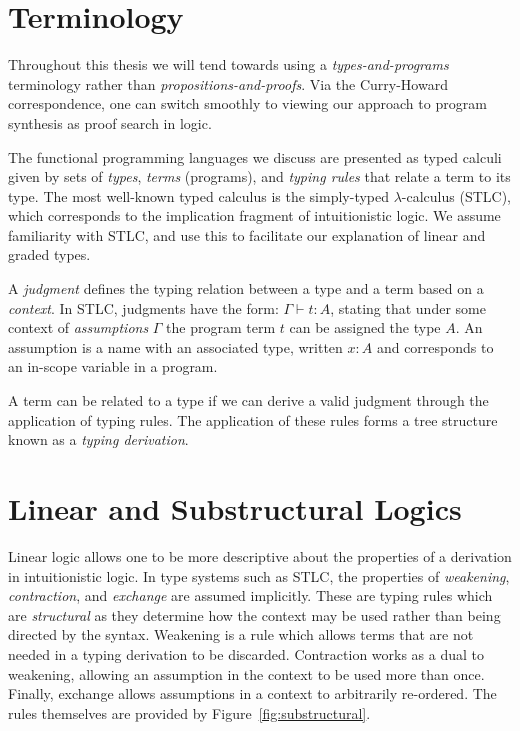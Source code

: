 \section{Terminology}
Throughout this thesis we will tend towards using a \textit{types-and-programs}
terminology rather than \textit{propositions-and-proofs}. Via the Curry-Howard
correspondence, one can switch smoothly to viewing our approach to program
synthesis as proof search in logic.

The functional programming languages we discuss are presented as typed
calculi given by sets of \textit{types}, \textit{terms} (programs), and \textit{typing
 rules} that relate a term to its type. The most well-known typed
calculus is the simply-typed $\lambda$-calculus (STLC), which corresponds to
the implication fragment of intuitionistic logic. We assume familiarity with STLC, and 
use this to facilitate our explanation of linear and graded types.

A \textit{judgment} defines the typing relation between a type and a term based on a
\textit{context}. In STLC, judgments have the
form: $\Gamma \vdash t : A$, stating that under some context of
\textit{assumptions} $\Gamma$ the program term $t$ can be assigned the type $A$.
An assumption is a name with an associated type, written $x : A$ and
corresponds to an in-scope variable in a program.

A term can be related to a type if we can derive a valid judgment through the
application of typing rules. The application of these rules forms a tree
structure known as a \textit{typing derivation}.

\section{Linear and Substructural Logics}
Linear logic allows one to be more descriptive about the properties of a
derivation in intuitionistic logic. In type systems such as STLC, the properties
of \textit{weakening}, \textit{contraction}, and \textit{exchange} are assumed
implicitly. These are typing rules which are \textit{structural} as they
determine how the context may be used rather than being directed by the syntax.
Weakening is a rule which allows terms that are not needed in a typing
derivation to be discarded. Contraction works as a dual to weakening, allowing
an assumption in the context to be used more than once. Finally, exchange allows
assumptions in a context to arbitrarily re-ordered. The rules themselves are
provided by Figure~\ref{fig:substructural}.

